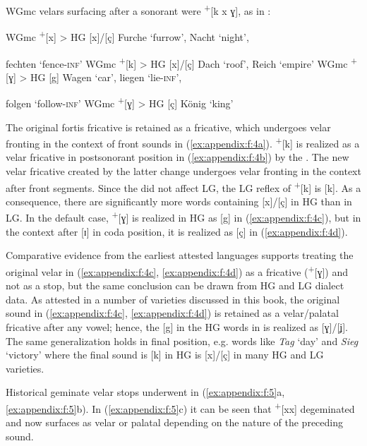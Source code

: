 WGmc velars surfacing after a sonorant were \textsuperscript{+}[k x ɣ], as in :

\ea%
    \label{ex:appendix:f:4}
\ea  \label{ex:appendix:f:4a}
WGmc \textsuperscript{+}[x] > HG [x]/[ç]  Furche ‘furrow’, Nacht ‘night’,

          fechten ‘fence\textsc{{}-inf}’
\ex \label{ex:appendix:f:4b}
WGmc \textsuperscript{+}[k] > HG [x]/[ç]  Dach ‘roof’, Reich ‘empire’
\ex \label{ex:appendix:f:4c}
WGmc \textsuperscript{+}[ɣ] > HG [g]  Wagen ‘car’, liegen ‘lie\textsc{{}-inf}’,

          folgen ‘follow\textsc{{}-inf}’
\ex \label{ex:appendix:f:4d}   WGmc \textsuperscript{+}[ɣ] > HG [ç]  König ‘king’

\z
\z

The original fortis fricative is retained as a fricative, which undergoes velar fronting in the context of front sounds in (\ref{ex:appendix:f:4a}).  \textsuperscript{+}[k] is realized as a velar fricative in postsonorant position in (\ref{ex:appendix:f:4b}) by the  \citep{Braune2004}. The new velar fricative created by the latter change undergoes velar fronting in the context after front segments. Since the  did not affect LG, the LG reflex of  \textsuperscript{+}[k] is [k]. As a consequence, there are significantly more words containing [x]/[ç] in HG than in LG. In the default case,  \textsuperscript{+}[ɣ] is realized in HG as [g] in (\ref{ex:appendix:f:4c}), but in the context after [ɪ] in coda position, it is realized as [ç] in (\ref{ex:appendix:f:4d}).

  Comparative evidence from the earliest attested  languages supports treating the original velar in (\ref{ex:appendix:f:4c}, \ref{ex:appendix:f:4d}) as a fricative (\textsuperscript{+}[ɣ]) and not as a stop, but the same conclusion can be drawn from HG and LG dialect data. As attested in a number of varieties discussed in this book, the original  sound in (\ref{ex:appendix:f:4c}, \ref{ex:appendix:f:4d}) is retained as a velar/palatal fricative after any vowel; hence, the [g] in the HG words in  is realized as [ɣ]/[ʝ]. The same generalization holds in final position, e.g. words like \textit{Tag} ‘day’ and \textit{Sieg} ‘victory’ where the final sound is [k] in HG is [x]/[ç] in many HG and LG varieties.

Historical geminate velar stops underwent  in (\ref{ex:appendix:f:5}a, \ref{ex:appendix:f:5}b). In (\ref{ex:appendix:f:5}c) it can be seen that  \textsuperscript{+}[xx] degeminated and now surfaces as velar or palatal depending on the nature of the preceding sound.

